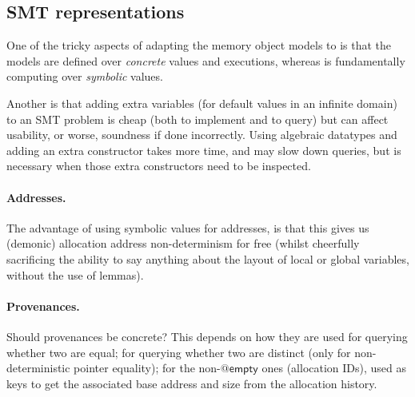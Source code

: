 \subsection{SMT representations}

One of the tricky aspects of adapting the memory object models to  is
that the models are defined over \emph{concrete} values and executions, whereas
 is fundamentally computing over \emph{symbolic} values.

Another is that adding extra variables (for default values in an infinite
domain) to an SMT problem is cheap (both to implement and to query) but can
affect usability, or worse, soundness if done incorrectly. Using algebraic
datatypes and adding an extra constructor takes more time, and may slow down
queries, but is necessary when those extra constructors need to be inspected.

\paragraph{Addresses.}%
The advantage of using symbolic values for addresses, is that this gives us
(demonic) allocation address non-determinism for free (whilst cheerfully
sacrificing the ability to say anything about the layout of local or global
variables, without the use of lemmas).

\paragraph{Provenances.}%
Should provenances be concrete? This depends on how they are used \textemdash{}
for querying whether two are equal; for querying whether two are distinct (only
for non-deterministic pointer equality); for the non-$@\mathsf{empty}$ ones
(allocation IDs), used as keys to get the associated base address and size from
the allocation history.


